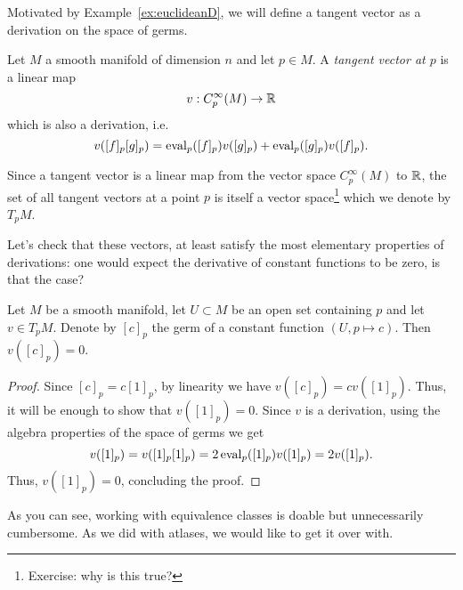 Motivated by Example~\ref{ex:euclideanD}, we will define a tangent vector as a derivation on the space of germs.

\begin{definition}
  Let $M$ a smooth manifold of dimension $n$ and let $p\in M$.
  A \emph{tangent vector at $p$} is a linear map
  \begin{equation}\label{def:tangentvector}
    v: C_p^\infty(M)\to\mathbb{R}
  \end{equation}
  which is also a derivation, i.e.
  \begin{equation}
    v([f]_p [g]_p) =
      \operatorname{eval}_p([f]_p)v([g]_p)
      + \operatorname{eval}_p([g]_p)v([f]_p).
  \end{equation}

  Since a tangent vector is a linear map from the vector space $C_p^\infty(M)$ to $\mathbb{R}$, the set of all tangent vectors at a point $p$ is itself a vector space\footnote{Exercise: why is this true?} which we denote by $T_p M$.
\end{definition}

Let's check that these vectors, at least satisfy the most elementary properties of derivations: one would expect the derivative of constant functions to be zero, is that the case?

\begin{lemma}\label{lem:f'0is0forconst}
  Let $M$ be a smooth manifold, let $U\subset M$ be an open set containing $p$ and let $v\in T_p M$.
  Denote by $[c]_p$ the germ of a constant function $(U, p \mapsto c)$.
  Then $v([c]_p) = 0$.
\end{lemma}
\begin{proof}
  Since $[c]_p = c [1]_p$, by linearity we have $v([c]_p) = c v([1]_p)$.
  Thus, it will be enough to show that $v([1]_p) = 0$.
  Since $v$ is a derivation, using the algebra properties of the space of germs we get
  \begin{equation}
    v([1]_p) = v([1]_p [1]_p) = 2 \operatorname{eval}_p([1]_p)v([1]_p) = 2 v([1]_p).
  \end{equation}
  Thus, $v([1]_p) = 0$, concluding the proof.
\end{proof}

As you can see, working with equivalence classes is doable but unnecessarily cumbersome.
As we did with atlases, we would like to get it over with.

